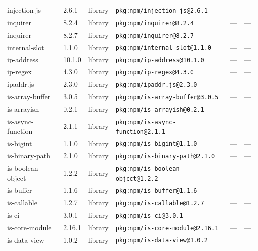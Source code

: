 \documentclass[11pt,a4paper]{article}
\begin{document}
\begin{longtable}{|p{4cm}|p{2cm}|p{1.6cm}|p{5cm}|p{1.5cm}|p{3.5cm}|}
\raggedright injection-js & 2.6.1 & library & \small\texttt{pkg:npm/injection-js@2.6.1} & — & \small — \\
\raggedright inquirer & 8.2.4 & library & \small\texttt{pkg:npm/inquirer@8.2.4} & — & \small — \\
\raggedright inquirer & 8.2.7 & library & \small\texttt{pkg:npm/inquirer@8.2.7} & — & \small — \\
\raggedright internal-slot & 1.1.0 & library & \small\texttt{pkg:npm/internal-slot@1.1.0} & — & \small — \\
\raggedright ip-address & 10.1.0 & library & \small\texttt{pkg:npm/ip-address@10.1.0} & — & \small — \\
\raggedright ip-regex & 4.3.0 & library & \small\texttt{pkg:npm/ip-regex@4.3.0} & — & \small — \\
\raggedright ipaddr.js & 2.3.0 & library & \small\texttt{pkg:npm/ipaddr.js@2.3.0} & — & \small — \\
\raggedright is-array-buffer & 3.0.5 & library & \small\texttt{pkg:npm/is-array-buffer@3.0.5} & — & \small — \\
\raggedright is-arrayish & 0.2.1 & library & \small\texttt{pkg:npm/is-arrayish@0.2.1} & — & \small — \\
\raggedright is-async-function & 2.1.1 & library & \small\texttt{pkg:npm/is-async-function@2.1.1} & — & \small — \\
\raggedright is-bigint & 1.1.0 & library & \small\texttt{pkg:npm/is-bigint@1.1.0} & — & \small — \\
\raggedright is-binary-path & 2.1.0 & library & \small\texttt{pkg:npm/is-binary-path@2.1.0} & — & \small — \\
\raggedright is-boolean-object & 1.2.2 & library & \small\texttt{pkg:npm/is-boolean-object@1.2.2} & — & \small — \\
\raggedright is-buffer & 1.1.6 & library & \small\texttt{pkg:npm/is-buffer@1.1.6} & — & \small — \\
\raggedright is-callable & 1.2.7 & library & \small\texttt{pkg:npm/is-callable@1.2.7} & — & \small — \\
\raggedright is-ci & 3.0.1 & library & \small\texttt{pkg:npm/is-ci@3.0.1} & — & \small — \\
\raggedright is-core-module & 2.16.1 & library & \small\texttt{pkg:npm/is-core-module@2.16.1} & — & \small — \\
\raggedright is-data-view & 1.0.2 & library & \small\texttt{pkg:npm/is-data-view@1.0.2} & — & \small — \\

\end{longtable}
\end{document}
